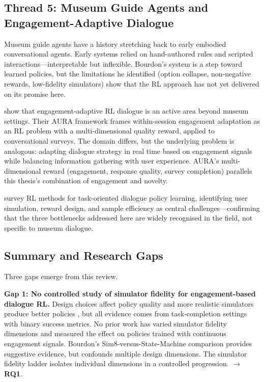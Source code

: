 \documentclass[a4paper, 11pt]{article}
\newcommand{\researchq}[1]{\textbf{RQ#1}}
\begin{document}
\subsection{Thread 5: Museum Guide Agents and Engagement-Adaptive Dialogue}
\label{sec:lit_museum}

Museum guide agents have a history stretching back to early embodied conversational agents. Early systems relied on hand-authored rules and scripted interactions---interpretable but inflexible. Bourdon's system is a step toward learned policies, but the limitations he identified (option collapse, non-negative rewards, low-fidelity simulators) show that the RL approach has not yet delivered on its promise here.

\citet{potdar2025aura} show that engagement-adaptive RL dialogue is an active area beyond museum settings. Their AURA framework frames within-session engagement adaptation as an RL problem with a multi-dimensional quality reward, applied to conversational surveys. The domain differs, but the underlying problem is analogous: adapting dialogue strategy in real time based on engagement signals while balancing information gathering with user experience. AURA's multi-dimensional reward (engagement, response quality, survey completion) parallels this thesis's combination of engagement and novelty.

\citet{chen2022survey} survey RL methods for task-oriented dialogue policy learning, identifying user simulation, reward design, and sample efficiency as central challenges---confirming that the three bottlenecks addressed here are widely recognised in the field, not specific to museum dialogue.

\subsection{Summary and Research Gaps}
\label{sec:lit_gaps}

Three gaps emerge from this review.

\textbf{Gap 1: No controlled study of simulator fidelity for engagement-based dialogue RL.} Design choices affect policy quality \citep{kreyssig2019neural} and more realistic simulators produce better policies \citep{yang2023adversarial}, but all evidence comes from task-completion settings with binary success metrics. No prior work has varied simulator fidelity dimensions and measured the effect on policies trained with continuous engagement signals. Bourdon's Sim8-versus-State-Machine comparison provides suggestive evidence, but confounds multiple design dimensions. The simulator fidelity ladder isolates individual dimensions in a controlled progression. $\to$ \researchq{1}.
\end{document}
